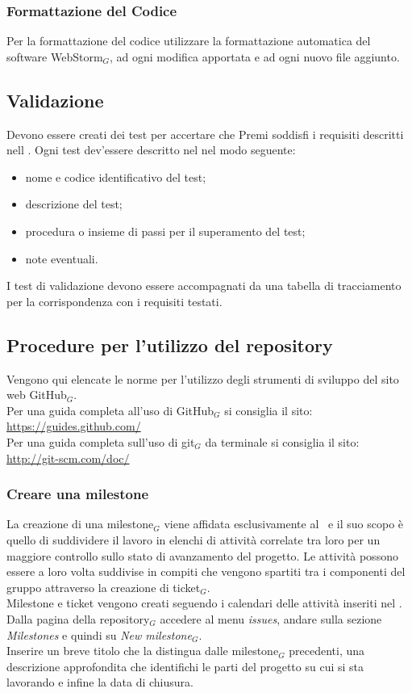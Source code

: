 \subsubsection{Formattazione del Codice}
Per la formattazione del codice utilizzare la formattazione automatica del software WebStorm$_G$, ad ogni modifica apportata e ad ogni nuovo file aggiunto.

\subsection{Validazione}
Devono essere creati dei test per accertare che Premi soddisfi i  requisiti descritti nell \AR{}. Ogni test dev'essere descritto nel \PdQ{} nel modo seguente:
\begin{itemize}
\item nome e codice identificativo del test;
\item descrizione del test;
\item procedura o insieme di passi per il superamento del test;
\item note eventuali.
\end{itemize}
I test di validazione devono essere accompagnati da una tabella di tracciamento per la corrispondenza con i requisiti testati. 


\subsection{Procedure per l'utilizzo del repository} \label{procedureticket}
Vengono qui elencate le norme per l'utilizzo degli strumenti di sviluppo del sito web GitHub$_G$. \\
Per una guida completa all'uso di GitHub$_G$ si consiglia il sito: \\
\url{https://guides.github.com/}\\
Per una guida completa sull'uso di git$_G$ da terminale si consiglia il sito: \\
\url{http://git-scm.com/doc/}

\subsubsection{Creare una milestone}
La creazione di una milestone$_G$ viene affidata esclusivamente al \ruoloResponsabile\ e il suo scopo è quello di suddividere il lavoro in elenchi di attività correlate tra loro per un maggiore controllo sullo stato di avanzamento del progetto. Le attività possono essere a loro volta suddivise in compiti che vengono spartiti tra i componenti del gruppo attraverso la creazione di ticket$_G$. \\
Milestone e ticket vengono creati seguendo i calendari delle attività inseriti nel \PdP . \\
    Dalla pagina della repository$_G$ accedere al menu \textit{issues}, andare sulla sezione \textit{Milestones} e quindi su \textit{New milestone$_G$}.\\
    Inserire un breve titolo che la distingua dalle milestone$_G$ precedenti, una descrizione approfondita che identifichi le parti del progetto su cui si sta lavorando e infine la data di chiusura.

